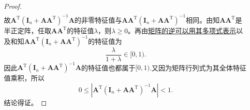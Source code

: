 \documentclass[../../main.tex]{subfiles}
\begin{document}
\begin{proof}
\begin{align*}
\end{align*}
故$\boldsymbol{A}^{\mathrm{T}} \left( \boldsymbol{I}_n + \boldsymbol{A}\boldsymbol{A}^{\mathrm{T}} \right)^{-1}\boldsymbol{A}$的非零特征值与$\boldsymbol{A}\boldsymbol{A}^{\mathrm{T}} \left( \boldsymbol{I}_n + \boldsymbol{A}\boldsymbol{A}^{\mathrm{T}} \right)^{-1}$相同。由知$\boldsymbol{A}\boldsymbol{A}^{\mathrm{T}}$是半正定阵，任取$\boldsymbol{A}\boldsymbol{A}^{\mathrm{T}}$的特征值$\lambda$，则$\lambda \geqslant 0$。再由\hyperref[proposition:矩阵的逆可以用其多项式表示]{矩阵的逆可以用其多项式表示}以及和知$\boldsymbol{A}\boldsymbol{A}^{\mathrm{T}} \left( \boldsymbol{I}_n + \boldsymbol{A}\boldsymbol{A}^{\mathrm{T}} \right)^{-1}$的特征值为
$$\frac{\lambda}{1 + \lambda} \in [0, 1).$$
因此$\boldsymbol{A}^{\mathrm{T}}(\boldsymbol{I}_n + \boldsymbol{A}\boldsymbol{A}^{\mathrm{T}})^{-1}\boldsymbol{A}$的特征值也都属于$[0,1)$.又因为矩阵行列式为其全体特征值乘积，所以
$$0 \leqslant \left| \boldsymbol{A}^{\mathrm{T}}(\boldsymbol{I}_n + \boldsymbol{A}\boldsymbol{A}^{\mathrm{T}})^{-1}\boldsymbol{A} \right| < 1.$$
结论得证。

\end{proof}
\end{document}
